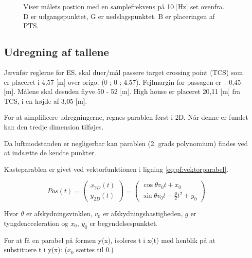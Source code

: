 \begin{figure}[!th]
\centering
\begin{tikzpicture}[scale=2]

\end{tikzpicture}
\caption[tekst i indholdsfortegnelsen]{Viser målets postion med en samplefrekvens på 10 [Hz] set ovenfra. D er udgangspunktet, G er nedslagspunktet. B er placeringen af PTS.}
\label{fig:para_in_xyz_plane}
\end{figure}



\subsection{Udregning af tallene}
\label{sec:udregning_af_parabel}


Jævnfør reglerne for ES, skal duer/mål passere target crossing point (TCS) som er 
placeret i 4,57 [m] over origo. (0 ; 0 ; 4.57). Fejlmargin for passagen er \(\pm\)0,45 [m]. 
Målene skal desuden flyve 50 - 52 [m].  High house er placeret 20,11 [m] fra TCS, i en 
højde af 3,05 [m]. 

For at simplificere udregningerne, regnes parablen først i 2D. Når denne er fundet kan den tredje dimension tilføjes.  

Da luftmodstanden er negligerbar kan parablen (2. grads polynomium) findes ved at indsætte de kendte punkter. 

Kasteparablen er givet ved vektorfunktionen i ligning  \ref{eq:pf:vektorparabel}.

\begin{equation}
	Pos(t) = \left( \begin{array}{c}
	x_{2D}(t) \\
	y_{2D}(t)
	\end{array}
	\right)
	= \left( \begin{array}{c}
	\cos \theta v_0 t + x_0 \\
	\sin \theta v_0 t - \frac{g}{2} t^2 + y_0
	\end{array}
	\right)
\label{eq:pf:vektorparabel}
\end{equation}

Hvor \(\theta\) er afskydningsvinklen, \(v_0\) er afskydningshastigheden, \(g\) er tyngdeacceleration og \(x_0\), \(y_0\) er begyndelsespunktet. 

For at få en parabel på formen y(x), isoleres t i x(t) med henblik på at substituere t i y(x): (\(x_0\) sættes til 0.)

